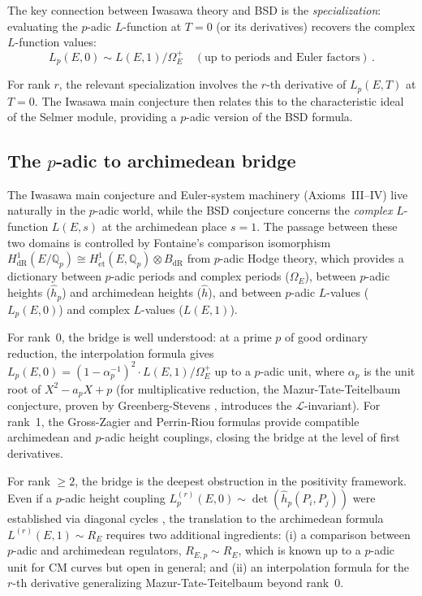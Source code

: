 \documentclass[aps,prd,twocolumn,superscriptaddress,nofootinbib]{revtex4-2}
\theoremstyle{definition}
\theoremstyle{remark}
\begin{document}
The key connection between Iwasawa theory and BSD is the \textit{specialization}: evaluating the $p$-adic $L$-function at $T = 0$ (or its derivatives) recovers the complex $L$-function values:
\begin{equation}
L_p(E, 0) \sim L(E, 1)/\Omega_E^+ \quad (\text{up to periods and Euler factors})\,.
\end{equation}

For rank $r$, the relevant specialization involves the $r$-th derivative of $L_p(E, T)$ at $T = 0$. The Iwasawa main conjecture then relates this to the characteristic ideal of the Selmer module, providing a $p$-adic version of the BSD formula.

\subsection{The $p$-adic to archimedean bridge}
\label{sec:p-adic-bridge}

The Iwasawa main conjecture and Euler-system machinery (Axioms~III--IV) live naturally in the $p$-adic world, while the BSD conjecture concerns the \textit{complex} $L$-function $L(E,s)$ at the archimedean place $s = 1$. The passage between these two domains is controlled by Fontaine's comparison isomorphism $H^1_{\mathrm{dR}}(E/\mathbb{Q}_p) \cong H^1_{\mathrm{\acute{e}t}}(E, \mathbb{Q}_p) \otimes B_{\mathrm{dR}}$ from $p$-adic Hodge theory, which provides a dictionary between $p$-adic periods and complex periods ($\Omega_E$), between $p$-adic heights ($\hat{h}_p$) and archimedean heights ($\hat{h}$), and between $p$-adic $L$-values ($L_p(E,0)$) and complex $L$-values ($L(E,1)$).

For rank~0, the bridge is well understood: at a prime $p$ of good ordinary reduction, the interpolation formula gives $L_p(E,0) = (1 - \alpha_p^{-1})^2 \cdot L(E,1)/\Omega_E^+$ up to a $p$-adic unit, where $\alpha_p$ is the unit root of $X^2 - a_p X + p$ (for multiplicative reduction, the Mazur-Tate-Teitelbaum conjecture, proven by Greenberg-Stevens \cite{GreenbergStevens1993}, introduces the $\mathcal{L}$-invariant). For rank~1, the Gross-Zagier and Perrin-Riou \cite{PerrinRiou1987} formulas provide compatible archimedean and $p$-adic height couplings, closing the bridge at the level of first derivatives.

For rank $\geq 2$, the bridge is the deepest obstruction in the positivity framework. Even if a $p$-adic height coupling $L_p^{(r)}(E,0) \sim \det(\hat{h}_p(P_i, P_j))$ were established via diagonal cycles \cite{DarmonRotger2017}, the translation to the archimedean formula $L^{(r)}(E,1) \sim R_E$ requires two additional ingredients: (i) a comparison between $p$-adic and archimedean regulators, $R_{E,p} \sim R_E$, which is known up to a $p$-adic unit for CM curves but open in general; and (ii) an interpolation formula for the $r$-th derivative generalizing Mazur-Tate-Teitelbaum beyond rank~0.
\end{document}
